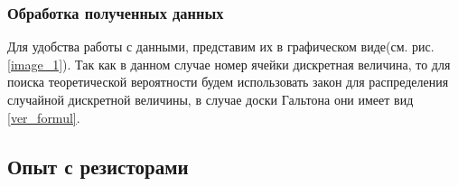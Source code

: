 \subsubsection{Обработка полученных данных}

Для удобства работы с данными, представим их в графическом виде(см. рис. \ref{image_1}). Так как в данном случае номер ячейки дискретная величина, то для поиска теоретической вероятности будем использовать закон для распределения случайной дискретной величины, в случае доски Гальтона они имеет вид \eqref{ver_formul}.


\subsection{Опыт с резисторами}

